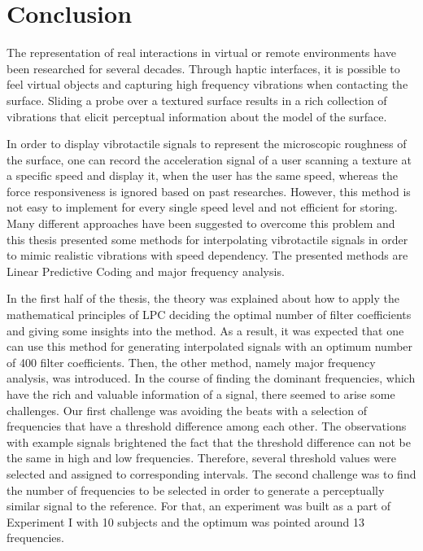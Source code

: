 \chapter{Conclusion}
\thispagestyle{empty}%
The representation of real interactions in virtual or remote environments have been researched for several decades. Through haptic interfaces, it is possible to feel virtual objects and capturing high frequency vibrations when contacting the surface. Sliding a probe over a textured surface results in a rich collection of vibrations that elicit perceptual information about the model of the surface.

In order to display vibrotactile signals to represent the microscopic roughness of the surface, one can record the acceleration signal of a user scanning a texture at a specific speed and display it, when the user has the same speed, whereas the force responsiveness is ignored based on past researches. However, this method is not easy to implement for every single speed level and not efficient for storing. Many different approaches have been suggested to overcome this problem and this thesis presented some methods for interpolating vibrotactile signals in order to mimic realistic vibrations with speed dependency. The presented methods are Linear Predictive Coding and major frequency analysis.

In the first half of the thesis, the theory was explained about how to apply the mathematical principles of LPC deciding the optimal number of filter coefficients and giving some insights into the method. As a result, it was expected that one can use this method for generating interpolated signals with an optimum number of 400 filter coefficients. Then, the other method, namely major frequency analysis, was introduced. In the course of finding the dominant frequencies, which have the rich and valuable information of a signal, there seemed to arise some challenges. Our first challenge was avoiding the beats with a selection of frequencies that have a threshold difference among each other. The observations with example signals brightened the fact that the threshold difference can not be the same in high and low frequencies. Therefore, several threshold values were selected and assigned to corresponding intervals. The second challenge was to find the number of frequencies to be selected in order to generate a perceptually similar signal to the reference. For that, an experiment was built as a part of Experiment I with 10 subjects and the optimum was pointed around 13 frequencies.

